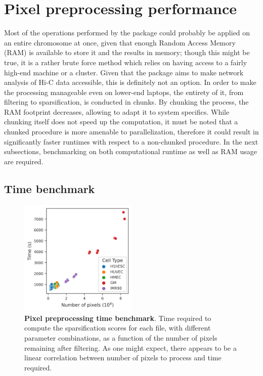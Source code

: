 \section{Pixel preprocessing performance}
Most of the operations performed by the package could probably be applied on an entire chromosome at once, given that enough Random Access Memory (RAM) is available to store it and the results in memory; though this might be true, it is a rather brute force method which relies on having access to a fairly high-end machine or a cluster. Given that the package aims to make network analysis of Hi-C data accessible, this is definitely not an option. In order to make the processing manageable even on lower-end laptops, the entirety of it, from filtering to sparsification, is conducted in chunks. By chunking the process, the RAM footprint decreases, allowing to adapt it to system specifics. While chunking itself does not speed up the computation, it must be noted that a chunked procedure is more amenable to parallelization, therefore it could result in significantly faster runtimes with respect to a non-chunked procedure. 
In the next subsections, benchmarking on both computational runtime as well as RAM usage are required.

\subsection{Time benchmark}

\begin{figure}[ht]
  \centering
  \includegraphics[width=0.5\textwidth]{time_benchmark.png}
  \caption{\textbf{Pixel preprocessing time benchmark}. Time required to compute the sparsification scores for each file, with different parameter combinations, as a function of the number of pixels remaining after filtering. As one might expect, there appears to be a linear correlation between number of pixels to process and time required.}
  \label{fig:timebenchmark}
\end{figure}

